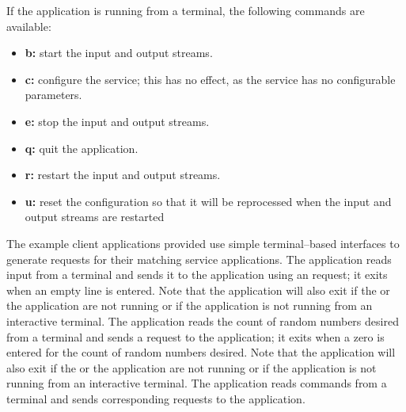 If the application is running from a terminal, the following commands are available:
\begin{itemize}
\item \textbf{b:} start the input and output streams. 
\item \textbf{c:} configure the service; this has no effect, as the service has no
configurable parameters. 
\item \textbf{e:} stop the input and output streams. 
\item \textbf{q:} quit the application. 
\item \textbf{r:} restart the input and output streams.
\item \textbf{u:} reset the configuration so that it will be reprocessed when the input
and output streams are restarted 
\end{itemize}
\secondaryEnd{}
The example client applications provided use simple terminal--based interfaces to
generate requests for their matching service applications.
The  application reads input from a terminal and
sends it to the  application using an
 request; it exits when an empty line is
entered.
Note that the application will also exit if the
 or the
 application are not running or if the application
is not running from an interactive terminal.
The  application reads the count of
random numbers desired from a terminal and sends a
 request to the
 application; it exits when a zero is
entered for the count of random numbers desired.
Note that the application will also exit if the
 or the
 application are not running or if the
application is not running from an interactive terminal.
The  application reads commands from a
terminal and sends corresponding requests to the
 application.\\

